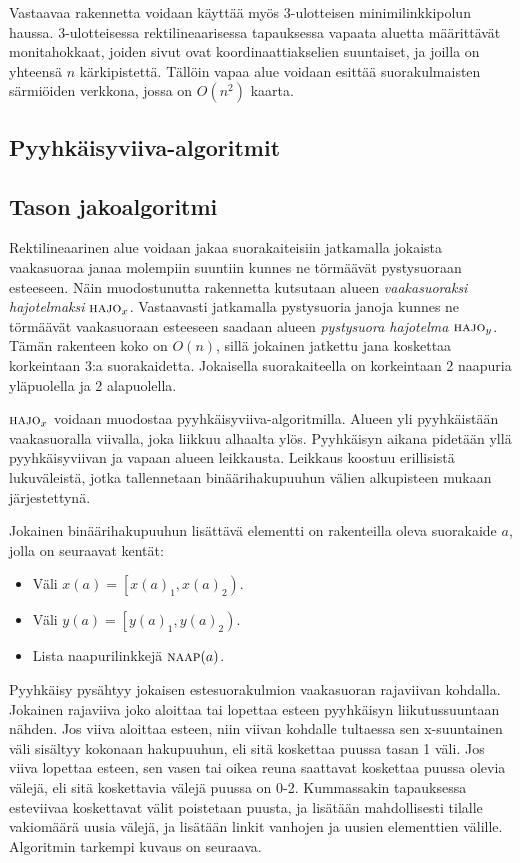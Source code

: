 \documentclass[finnish]{tktltiki2}
\theoremstyle{definition}
\theoremstyle{remark}
\newcommand\range[2]{\ensuremath{\left [ #1 , #2 \right )}\xspace}
\newcommand\xrange[1]{\ensuremath{x(#1)}\xspace}
\newcommand\yrange[1]{\ensuremath{y(#1)}\xspace}
\newcommand\xranget[2]{\ensuremath{x(#1)_{#2}}\xspace}
\newcommand\yranget[2]{\ensuremath{y(#1)_{#2}}\xspace}
\newcommand\nbs[1]{\ensuremath{\textsc{naap}{(#1)}}\xspace}
\newcommand\decomp[1]{\ensuremath{\textsc{hajo}_{#1}}\xspace}
\begin{document}
Vastaavaa rakennetta voidaan käyttää myös 3-ulotteisen minimilinkkipolun haussa.
3-ulotteisessa rektilineaarisessa tapauksessa vapaata aluetta määrittävät monitahokkaat, joiden sivut ovat koordinaattiakselien suuntaiset, ja joilla on yhteensä $n$ kärkipistettä.
Tällöin vapaa alue voidaan esittää suorakulmaisten särmiöiden verkkona, jossa on $O(n^2)$ kaarta.

\subsection{Pyyhkäisyviiva-algoritmit}\label{sec:sweep}

\subsection{Tason jakoalgoritmi}\label{sec:jako2d}

Rektilineaarinen alue voidaan jakaa suorakaiteisiin jatkamalla jokaista vaakasuoraa janaa molempiin suuntiin kunnes ne törmäävät pystysuoraan esteeseen.
Näin muodostunutta rakennetta kutsutaan alueen \emph{vaakasuoraksi hajotelmaksi} \decomp{x}.
Vastaavasti jatkamalla pystysuoria janoja kunnes ne törmäävät vaakasuoraan esteeseen saadaan alueen \emph{pystysuora hajotelma} \decomp{y}.
Tämän rakenteen koko on $O(n)$, sillä jokainen jatkettu jana koskettaa korkeintaan 3:a suorakaidetta.
Jokaisella suorakaiteella on korkeintaan 2 naapuria yläpuolella ja 2 alapuolella.

\decomp{x} voidaan muodostaa pyyhkäisyviiva-algoritmilla.
Alueen yli pyyhkäistään vaakasuoralla viivalla, joka liikkuu alhaalta ylös.
Pyyhkäisyn aikana pidetään yllä pyyhkäisyviivan ja vapaan alueen leikkausta.
Leikkaus koostuu erillisistä lukuväleistä, jotka tallennetaan binäärihakupuuhun välien alkupisteen mukaan järjestettynä.

Jokainen binäärihakupuuhun lisättävä elementti on rakenteilla oleva suorakaide $a$, jolla on seuraavat kentät:
\begin{itemize}
\item Väli $\xrange{a}=\range{\xranget{a}{1}}{\xranget{a}{2}}$.
\item Väli $\yrange{a}=\range{\yranget{a}{1}}{\yranget{a}{2}}$.
\item Lista naapurilinkkejä $\nbs{a}$.
\end{itemize}

Pyyhkäisy pysähtyy jokaisen estesuorakulmion vaakasuoran rajaviivan kohdalla.
Jokainen rajaviiva joko aloittaa tai lopettaa esteen pyyhkäisyn liikutussuuntaan nähden.
Jos viiva aloittaa esteen, niin viivan kohdalle tultaessa sen x-suuntainen väli sisältyy kokonaan hakupuuhun, eli sitä koskettaa puussa tasan 1 väli.
Jos viiva lopettaa esteen, sen vasen tai oikea reuna saattavat koskettaa puussa olevia välejä, eli sitä koskettavia välejä puussa on 0-2.
Kummassakin tapauksessa esteviivaa koskettavat välit poistetaan puusta, ja lisätään mahdollisesti tilalle vakiomäärä uusia välejä, ja lisätään linkit vanhojen ja uusien elementtien välille.
Algoritmin tarkempi kuvaus on seuraava.
\end{document}
